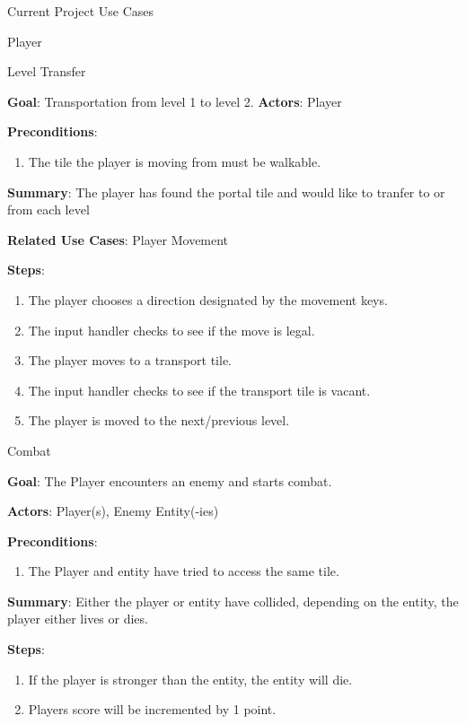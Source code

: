 \documentclass[12pt]{report}
\begin{document}
\begin{chapter}{Current Project Use Cases}
\begin{section}{Player}
    \begin{subsection}{Level Transfer}
      
      \textbf{Goal}:
      Transportation from level 1 to level 2.
      \textbf{Actors}:
      Player

      \textbf{Preconditions}:
      \begin{enumerate}
        \item The tile the player is moving from must be walkable.
      \end{enumerate}

      \textbf{Summary}:
      The player has found the portal tile and would like to tranfer to or from each level

      \textbf{Related Use Cases}:
      Player Movement

      \textbf{Steps}:
      \begin{enumerate}
        \item The player chooses a direction designated by the movement keys.
        \item The input handler checks to see if the move is legal.
        \item The player moves to a transport tile.
        \item The input handler checks to see if the transport tile is vacant.
        \item The player is moved to the next/previous level.
      \end{enumerate}
    \end{subsection}


    \begin{subsection}{Combat}
      
      \textbf{Goal}:
      The Player encounters an enemy and starts combat.
      
      \textbf{Actors}:
      Player(s), Enemy Entity(-ies)

      \textbf{Preconditions}:
      \begin{enumerate}
        \item The Player and entity have tried to access the same tile.
      \end{enumerate}

      \textbf{Summary}:
      Either the player or entity have collided, depending on the entity, the player either lives or dies.

      \textbf{Steps}:
      \begin{enumerate}
        \item If the player is stronger than the entity, the entity will die.
        \item Players score will be incremented by 1 point.
      \end{enumerate}


\end{subsection}
\end{section}
\end{chapter}
\end{document}
